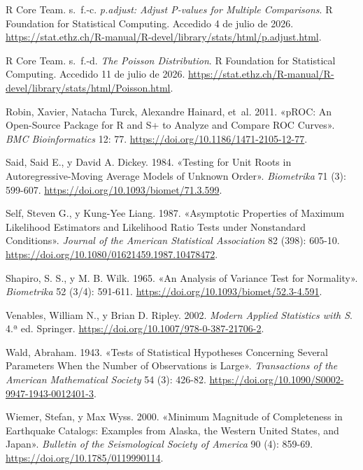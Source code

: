 \documentclass[
  spanish,
  letterpaper,
  DIV=11,
  numbers=noendperiod]{scrartcl}
\newlength{\cslhangindent}
\newenvironment{CSLReferences}[2] %
 {\begin{list}{}{%
  \setlength{\itemindent}{0pt}
  \setlength{\leftmargin}{0pt}
  \setlength{\parsep}{0pt}
  \ifodd #1
   \setlength{\leftmargin}{\cslhangindent}
   \setlength{\itemindent}{-1\cslhangindent}
  \fi
  \setlength{\itemsep}{#2\baselineskip}}}
 {\end{list}}
\begin{document}
\begin{CSLReferences}{1}{1}
R Core Team. s.~f.-c. \emph{p.adjust: Adjust P-values for Multiple
Comparisons}. R Foundation for Statistical Computing. Accedido 4 de
julio de 2026.
\url{https://stat.ethz.ch/R-manual/R-devel/library/stats/html/p.adjust.html}.

R Core Team. s.~f.-d. \emph{The Poisson Distribution}. R Foundation for
Statistical Computing. Accedido 11 de julio de 2026.
\url{https://stat.ethz.ch/R-manual/R-devel/library/stats/html/Poisson.html}.

Robin, Xavier, Natacha Turck, Alexandre Hainard, et~al. 2011. {«{pROC}:
An Open-Source Package for {R} and {S+} to Analyze and Compare {ROC}
Curves»}. \emph{BMC Bioinformatics} 12: 77.
\url{https://doi.org/10.1186/1471-2105-12-77}.

Said, Said E., y David A. Dickey. 1984. {«Testing for Unit Roots in
Autoregressive-Moving Average Models of Unknown Order»}.
\emph{Biometrika} 71 (3): 599-607.
\url{https://doi.org/10.1093/biomet/71.3.599}.

Self, Steven G., y Kung-Yee Liang. 1987. {«Asymptotic Properties of
Maximum Likelihood Estimators and Likelihood Ratio Tests under
Nonstandard Conditions»}. \emph{Journal of the American Statistical
Association} 82 (398): 605-10.
\url{https://doi.org/10.1080/01621459.1987.10478472}.

Shapiro, S. S., y M. B. Wilk. 1965. {«An Analysis of Variance Test for
Normality»}. \emph{Biometrika} 52 (3/4): 591-611.
\url{https://doi.org/10.1093/biomet/52.3-4.591}.

Venables, William N., y Brian D. Ripley. 2002. \emph{Modern Applied
Statistics with S}. 4.ª ed. Springer.
\url{https://doi.org/10.1007/978-0-387-21706-2}.

Wald, Abraham. 1943. {«Tests of Statistical Hypotheses Concerning
Several Parameters When the Number of Observations is Large»}.
\emph{Transactions of the American Mathematical Society} 54 (3): 426-82.
\url{https://doi.org/10.1090/S0002-9947-1943-0012401-3}.

Wiemer, Stefan, y Max Wyss. 2000. {«Minimum Magnitude of Completeness in
Earthquake Catalogs: Examples from Alaska, the Western United States,
and Japan»}. \emph{Bulletin of the Seismological Society of America} 90
(4): 859-69. \url{https://doi.org/10.1785/0119990114}.

\end{CSLReferences}
\end{document}
